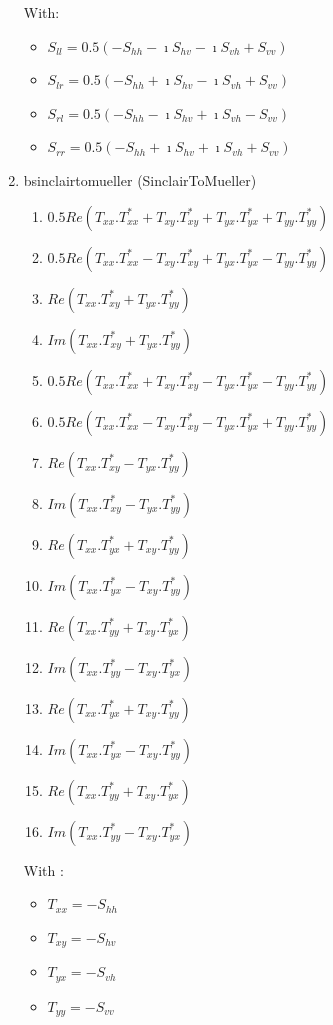 \begin{enumerate}
With:
\begin{itemize} 
\item $ S_{ll} = 0.5(-S_{hh}-\imath S_{hv}-\imath S_{vh}+S_{vv}) $ 
\item $ S_{lr} = 0.5(-S_{hh}+\imath S_{hv}-\imath S_{vh}+S_{vv}) $ 
\item $ S_{rl} = 0.5(-S_{hh}-\imath S_{hv}+\imath S_{vh}-S_{vv}) $ 
\item $ S_{rr} = 0.5(-S_{hh}+\imath S_{hv}+\imath S_{vh}+S_{vv}) $ 
\end{itemize}
 
\item bsinclairtomueller (SinclairToMueller)
\begin{enumerate} 
\item $ 0.5 Re( T_{xx}.T_{xx}^{*} + T_{xy}.T_{xy}^{*} + T_{yx}.T_{yx}^{*} + T_{yy}.T_{yy}^{*} ) $ 
\item $ 0.5 Re( T_{xx}.T_{xx}^{*} - T_{xy}.T_{xy}^{*} + T_{yx}.T_{yx}^{*} - T_{yy}.T_{yy}^{*} ) $ 
\item $ Re( T_{xx}.T_{xy}^{*} + T_{yx}.T_{yy}^{*} ) $ 
\item $ Im( T_{xx}.T_{xy}^{*} + T_{yx}.T_{yy}^{*} ) $ 
\item $ 0.5 Re( T_{xx}.T_{xx}^{*} + T_{xy}.T_{xy}^{*} - T_{yx}.T_{yx}^{*} - T_{yy}.T_{yy}^{*} ) $ 
\item $ 0.5 Re( T_{xx}.T_{xx}^{*} - T_{xy}.T_{xy}^{*} - T_{yx}.T_{yx}^{*} + T_{yy}.T_{yy}^{*} ) $ 
\item $ Re( T_{xx}.T_{xy}^{*} - T_{yx}.T_{yy}^{*} ) $ 
\item $ Im( T_{xx}.T_{xy}^{*} - T_{yx}.T_{yy}^{*} ) $ 
\item $ Re( T_{xx}.T_{yx}^{*} + T_{xy}.T_{yy}^{*} ) $ 
\item $ Im( T_{xx}.T_{yx}^{*} - T_{xy}.T_{yy}^{*} ) $ 
\item $ Re( T_{xx}.T_{yy}^{*} + T_{xy}.T_{yx}^{*} ) $ 
\item $ Im( T_{xx}.T_{yy}^{*} - T_{xy}.T_{yx}^{*} ) $ 
\item $ Re( T_{xx}.T_{yx}^{*} + T_{xy}.T_{yy}^{*} ) $ 
\item $ Im( T_{xx}.T_{yx}^{*} - T_{xy}.T_{yy}^{*} ) $ 
\item $ Re( T_{xx}.T_{yy}^{*} + T_{xy}.T_{yx}^{*} ) $ 
\item $ Im( T_{xx}.T_{yy}^{*} - T_{xy}.T_{yx}^{*} ) $
\end{enumerate}

With :
\begin{itemize}
\item $ T_{xx} = -S_{hh} $ 
\item $ T_{xy} = -S_{hv} $ 
\item $ T_{yx} = -S_{vh} $ 
\item $ T_{yy} = -S_{vv} $ 
\end{itemize}
 

\end{enumerate}
